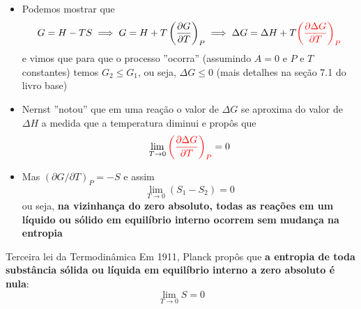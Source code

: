\documentclass[t,%
brazilian,%
11pt,%
aspectratio=169,%
table%
]{beamer}
\begin{document}
\begin{frame}
    \begin{itemize}
        \item Podemos mostrar que 
            \[
                G=H-TS \implies G=H+T\left(\dfrac{\partial G}{\partial T}\right)_P
                \implies \Delta G = \Delta H + T{\color{red}\left(\frac{\partial \Delta G}{\partial T}\right)_P}
            \]
            e vimos que para que o processo ''ocorra'' (assumindo \(A=0\) e
            \(P\) e \(T\) constantes) temos \(G_2 \leq G_1\), ou seja, \(\Delta G \leq 0\)
            (mais detalhes na seção 7.1 do livro base)
        \item Nernst ''notou'' que em uma reação o valor de \(\Delta G\) se aproxima do valor de \(\Delta H\) a medida
            que a temperatura diminui e propôs que
            \[
                \lim_{T \to 0} {\color{red}\left(\frac{\partial \Delta G}{\partial T} \right)_P} = 0
            \]
        \item Mas \(\left(\partial G / \partial T\right)_P =  -S\) e assim
            \[
                \lim_{T \to 0} {(S_1 - S_2)} = 0
            \]
            ou seja, \textbf{na vizinhança do zero absoluto, todas as reações em um líquido ou sólido
            em equilíbrio interno ocorrem sem mudança na entropia}
    \end{itemize}
\end{frame}

\begin{frame}[c]{Terceira lei da Termodinâmica}
     Em 1911, Planck propôs que \textbf{a entropia de toda substância sólida ou líquida em equilíbrio interno a 
     zero absoluto é nula}:
     \[
         \lim_{T\to 0} S = 0
     \]
 \end{frame}
\end{document}
